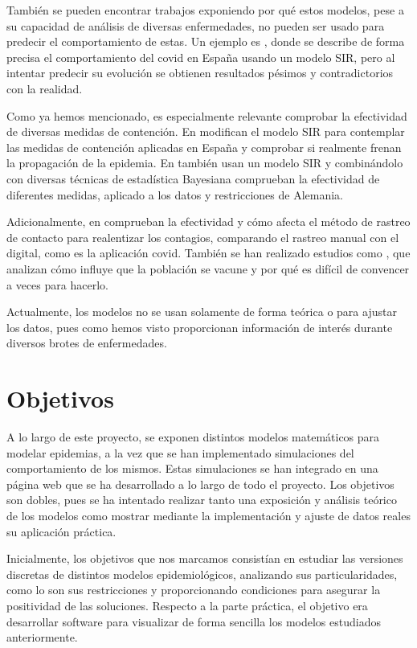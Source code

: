 También se pueden encontrar trabajos exponiendo por qué estos modelos, pese a su capacidad de análisis de diversas enfermedades, no pueden ser usado para predecir el comportamiento de estas. Un ejemplo es \cite{turningpoint}, donde se describe de forma precisa el comportamiento del covid en España usando un modelo SIR, pero al intentar predecir su evolución se obtienen resultados pésimos y contradictorios con la realidad.

Como ya hemos mencionado, es especialmente relevante comprobar la efectividad de diversas medidas de contención. En \cite{gutierrez2020analisis} modifican el modelo SIR para contemplar las medidas de contención aplicadas en España y comprobar si realmente frenan la propagación de la epidemia. En \cite{inferringinterventions} también usan un modelo SIR y combinándolo con diversas técnicas de estadística Bayesiana comprueban la efectividad de diferentes medidas, aplicado a los datos y restricciones de Alemania.

Adicionalmente, en \cite{Mancastroppa2021} comprueban la efectividad y cómo afecta el método de rastreo de contacto para realentizar los contagios, comparando el rastreo manual con el digital, como es la aplicación covid. También se han realizado estudios como \cite{vaccinationproblem}, que analizan cómo influye que la población se vacune y por qué es difícil de convencer a veces para hacerlo.

Actualmente, los modelos no se usan solamente de forma teórica o para ajustar los datos, pues como hemos visto proporcionan información de interés durante diversos brotes de enfermedades.


\section{Objetivos}

A lo largo de este proyecto, se exponen distintos modelos matemáticos para modelar epidemias, a la vez que se han implementado simulaciones del comportamiento de los mismos. Estas simulaciones se han integrado en una página web que se ha desarrollado a lo largo de todo el proyecto. Los objetivos son dobles, pues se ha intentado realizar tanto una exposición y análisis teórico de los modelos como mostrar mediante la implementación y ajuste de datos reales su aplicación práctica.

Inicialmente, los objetivos que nos marcamos consistían en estudiar las versiones discretas de distintos modelos epidemiológicos, analizando sus particularidades, como lo son sus restricciones y proporcionando condiciones para asegurar la positividad de las soluciones. Respecto a la parte práctica, el objetivo era desarrollar software para visualizar de forma sencilla los modelos estudiados anteriormente.

